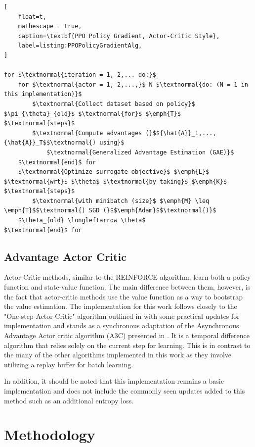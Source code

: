 \documentclass[conference]{IEEEtran}
\begin{document}
\begin{lstlisting}[
    float=t,
    mathescape = true,
    caption=\textbf{PPO Policy Gradient, Actor-Critic Style},
    label=listing:PPOPolicyGradientAlg,
]

for $\textnormal{iteration = 1, 2,... do:}$
    for $\textnormal{actor = 1, 2,...,}$ N $\textnormal{do: (N = 1 in this implementation)}$
        $\textnormal{Collect dataset based on policy}$ $\pi_{\theta}_{old}$ $\textnormal{for}$ $\emph{T}$ $\textnormal{steps}$
        $\textnormal{Compute advantages (}$${\hat{A}}_1,..., {\hat{A}}_T$$\textnormal{) using}$
            $\textnormal{Generalized Advantage Estimation (GAE)}$
    $\textnormal{end}$ for
    $\textnormal{Optimize surrogate objective}$ $\emph{L}$ $\textnormal{wrt}$ $\theta$ $\textnormal{by taking}$ $\emph{K}$ $\textnormal{steps}$
        $\textnormal{with minibatch (size}$ $\emph{M} \leq \emph{T}$$\textnormal{) SGD (}$$\emph{Adam}$$\textnormal{)}$
    $\theta_{old} \longleftarrow \theta$
$\textnormal{end}$ for

\end{lstlisting}

\subsection{Advantage Actor Critic}
Actor-Critic methods, similar to the REINFORCE algorithm, learn both a policy function and state-value function.
The main difference between them, however, is the fact that actor-critic methods use the value function as a way to bootstrap the value estimation.
The implementation for this work follows closely to the "One-step Actor-Critic" algorithm outlined in \cite{ReinforcementLearningBook} with some practical updates for implementation and stands as a synchronous adaptation of the Asynchronous Advantage Actor critic algorithm (A3C) presented in \cite{mnih2016asynchronous}.
It is a temporal difference algorithm that relies solely on the current step for learning.
This is in contrast to the many of the other algorithms implemented in this work as they involve utilizing a replay buffer for batch learning.

In addition, it should be noted that this implementation remains a basic implementation and does not include the commonly seen updates added to this method such as an additional entropy loss.

\section{Methodology} \label{methodology}
\end{document}
